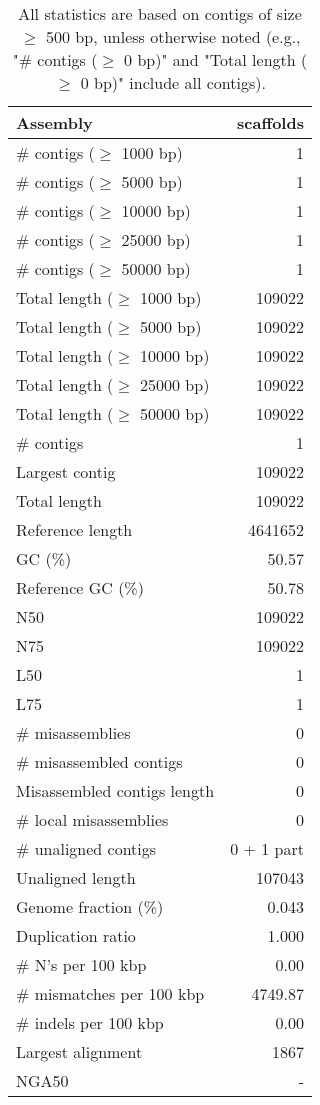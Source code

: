 \documentclass[12pt,a4paper]{article}
\begin{document}
\begin{table}[ht]
\begin{center}
\caption{All statistics are based on contigs of size $\geq$ 500 bp, unless otherwise noted (e.g., "\# contigs ($\geq$ 0 bp)" and "Total length ($\geq$ 0 bp)" include all contigs).}
\begin{tabular}{|l*{1}{|r}|}
\hline
Assembly & scaffolds \\ \hline
\# contigs ($\geq$ 1000 bp) & 1 \\ \hline
\# contigs ($\geq$ 5000 bp) & 1 \\ \hline
\# contigs ($\geq$ 10000 bp) & 1 \\ \hline
\# contigs ($\geq$ 25000 bp) & 1 \\ \hline
\# contigs ($\geq$ 50000 bp) & 1 \\ \hline
Total length ($\geq$ 1000 bp) & 109022 \\ \hline
Total length ($\geq$ 5000 bp) & 109022 \\ \hline
Total length ($\geq$ 10000 bp) & 109022 \\ \hline
Total length ($\geq$ 25000 bp) & 109022 \\ \hline
Total length ($\geq$ 50000 bp) & 109022 \\ \hline
\# contigs & 1 \\ \hline
Largest contig & 109022 \\ \hline
Total length & 109022 \\ \hline
Reference length & 4641652 \\ \hline
GC (\%) & 50.57 \\ \hline
Reference GC (\%) & 50.78 \\ \hline
N50 & 109022 \\ \hline
N75 & 109022 \\ \hline
L50 & 1 \\ \hline
L75 & 1 \\ \hline
\# misassemblies & 0 \\ \hline
\# misassembled contigs & 0 \\ \hline
Misassembled contigs length & 0 \\ \hline
\# local misassemblies & 0 \\ \hline
\# unaligned contigs & 0 + 1 part \\ \hline
Unaligned length & 107043 \\ \hline
Genome fraction (\%) & 0.043 \\ \hline
Duplication ratio & 1.000 \\ \hline
\# N's per 100 kbp & 0.00 \\ \hline
\# mismatches per 100 kbp & 4749.87 \\ \hline
\# indels per 100 kbp & 0.00 \\ \hline
Largest alignment & 1867 \\ \hline
NGA50 & - \\ \hline
\end{tabular}
\end{center}
\end{table}
\end{document}
